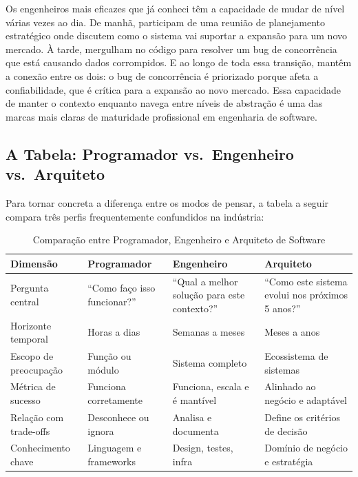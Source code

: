 Os engenheiros mais eficazes que já conheci têm a capacidade de mudar
de nível várias vezes ao dia. De manhã, participam de uma reunião de
planejamento estratégico onde discutem como o sistema vai suportar a
expansão para um novo mercado. À tarde, mergulham no código para resolver
um bug de concorrência que está causando dados corrompidos. E ao longo
de toda essa transição, mantêm a conexão entre os dois: o bug de
concorrência é priorizado porque afeta a confiabilidade, que é crítica
para a expansão ao novo mercado. Essa capacidade de manter o contexto
enquanto navega entre níveis de abstração é uma das marcas mais claras
de maturidade profissional em engenharia de software.

\subsection{A Tabela: Programador vs.\ Engenheiro vs.\ Arquiteto}

Para tornar concreta a diferença entre os modos de pensar, a tabela a
seguir compara três perfis frequentemente confundidos na indústria:

\begin{table}[h]
\centering
\caption{Comparação entre Programador, Engenheiro e Arquiteto de Software}
\begin{tabular}{p{3cm}p{3.5cm}p{3.5cm}p{3.5cm}}
\toprule
\textbf{Dimensão} & \textbf{Programador} & \textbf{Engenheiro} & \textbf{Arquiteto} \\
\midrule
Pergunta central & ``Como faço isso funcionar?'' & ``Qual a melhor solução para este contexto?'' & ``Como este sistema evolui nos próximos 5 anos?'' \\
\addlinespace
Horizonte temporal & Horas a dias & Semanas a meses & Meses a anos \\
\addlinespace
Escopo de preocupação & Função ou módulo & Sistema completo & Ecossistema de sistemas \\
\addlinespace
Métrica de sucesso & Funciona corretamente & Funciona, escala e é mantível & Alinhado ao negócio e adaptável \\
\addlinespace
Relação com trade-offs & Desconhece ou ignora & Analisa e documenta & Define os critérios de decisão \\
\addlinespace
Conhecimento chave & Linguagem e frameworks & Design, testes, infra & Domínio de negócio e estratégia \\
\bottomrule
\end{tabular}
\label{tab:programador-engenheiro-arquiteto}
\end{table}

